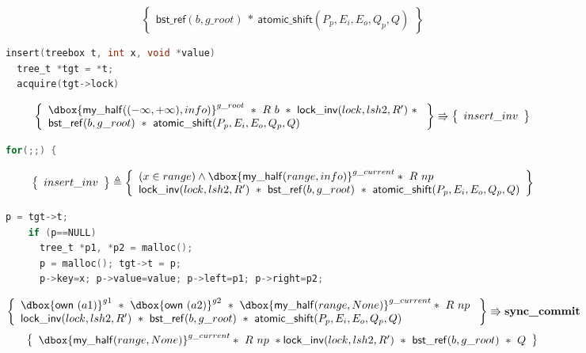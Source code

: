 \documentclass[acmsmall,screen]{acmart}\settopmatter{printfolios=true}
\newcommand\dboxed[1]{\dbox{\ensuremath{#1}}}
\newcommand{\ghost}[2]{\ensuremath{\dboxed{#1}^{#2}}}
\newcommand{\nodeboxrep}{\ensuremath{\mathsf{bst\_ref}}}
\begin{document}
\begin{figure}[htp]
\begin{subfigure}[t]{1\textwidth}
 $$\left\{\begin{array}{l} \nodeboxrep(b,g\_root)\ *\ \mathsf{atomic\_shift}(P_p,E_i,E_o,Q_p,Q)\end{array}\right\}$$
 \vspace*{-20pt}
\begin{lstlisting}[language = C,numbers = none]
insert(treebox t, int x, void *value)
  tree_t *tgt = *t;
  acquire(tgt->lock)
 \end{lstlisting}  
 $$\left\{\begin{array}{l} \ghost{\mathsf{my\_half}((-\infty,+\infty),info)}{g\_root}\ *\ R\ b\ *\ \mathsf{lock\_inv}(lock,lsh2,R')\ *\ \\
 \nodeboxrep(b,g\_root)\ *\ \mathsf{atomic\_shift}(P_p,E_i,E_o,Q_p,Q)\end{array}\right\} \Rrightarrow \left\{\begin{array}{l} insert\_inv \end{array}\right\}$$ 
  \begin{lstlisting}[language = C,numbers = none]
  for(;;) {
       \end{lstlisting}   
   $$\left\{\begin{array}{l} insert\_inv \end{array}\right\} \triangleq \left\{\begin{array}{l}(x\in range)\land \ghost{\mathsf{my\_half}(range,info)}{g\_current}*\ R\ np\ \\*\mathsf{lock\_inv}(lock,lsh2,R')\ *\ \nodeboxrep(b,g\_root)\ *\ \mathsf{atomic\_shift}(P_p,E_i,E_o,Q_p,Q)\end{array}\right\}$$
      \begin{lstlisting}[language = C,numbers = none]
    p = tgt->t;
    if (p==NULL)
      tree_t *p1, *p2 = malloc();
      p = malloc(); tgt->t = p;
      p->key=x; p->value=value; p->left=p1; p->right=p2;
           \end{lstlisting} 
  $$\left\{\begin{array}{l} \ghost{\mathsf{own}\ (a1)}{g1}\ *\ \ghost{\mathsf{own}\ (a2)}{g2}\ *\ \ghost{\mathsf{my\_half}(range,None)}{g\_current}*\ R\ np\ \\*\mathsf{lock\_inv}(lock,lsh2,R')\ *\ \nodeboxrep(b,g\_root)\ *\ \mathsf{atomic\_shift}(P_p,E_i,E_o,Q_p,Q)\end{array}\right\} \Rrightarrow{\textbf{sync\_commit}}$$
$$\left\{\begin{array}{l} \ghost{\mathsf{my\_half}(range,None)}{g\_current}*\ R\ np\ *\mathsf{lock\_inv}(lock,lsh2,R')\ *\ \nodeboxrep(b,g\_root)\ *\ Q\end{array}\right\}$$

\end{subfigure}
\end{figure}
\end{document}
